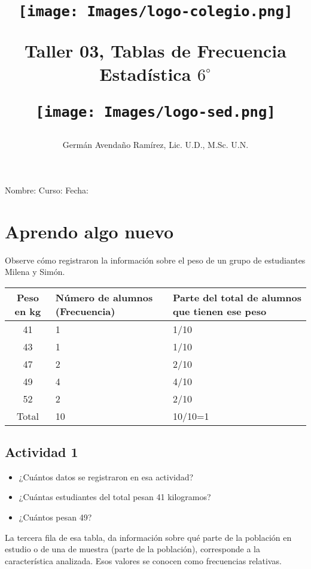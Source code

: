 \documentclass[10pt,twoside]{article}
\author{Germ\'an Avenda\~no Ram\'irez, Lic. U.D., M.Sc. U.N.}
\title{\begin{minipage}{.2\textwidth}
\texttt{[image: Images/logo-colegio.png]}\end{minipage}
\begin{minipage}{.55\textwidth}
\begin{center}
Taller 03, Tablas de Frecuencia  \\
Estadística $6^{\circ}$
\end{center}
\end{minipage}\hfill
\begin{minipage}{.2\textwidth}
\texttt{[image: Images/logo-sed.png]} 
\end{minipage}}
\date{}
\begin{document}
\maketitle
Nombre: \hrulefill Curso: \underline{\hspace*{44pt}} Fecha: \underline{\hspace*{2.5cm}}
\section*{Aprendo algo nuevo}
Observe cómo registraron la información sobre el peso de un grupo de estudiantes Milena y Simón.
\begin{center}
\begin{tabular}{|c|p{3.5cm}|p{6cm}|}
\hline 
Peso en kg & Número de alumnos (Frecuencia) & Parte del total de alumnos que tienen ese peso \\ 
\hline 
41 & 1 & 1/10 \\ 
\hline 
43 & 1 & 1/10 \\ 
\hline 
47 & 2 & 2/10 \\ 
\hline 
49 & 4 & 4/10 \\ 
\hline 
52 & 2 & 2/10 \\ 
\hline \hline
Total & 10 & 10/10=1 \\ \hline
\end{tabular} 
\end{center}
\subsection*{Actividad 1}
\begin{itemize}
\item ¿Cuántos datos se registraron en esa actividad?
\item ¿Cuántas estudiantes del total pesan 41 kilogramos?
\item ¿Cuántos pesan 49?
\end{itemize}
La tercera fila de esa tabla, da información sobre qué parte de la población en estudio o de una de muestra (parte de la población), corresponde a la característica analizada. Esos valores se conocen como frecuencias relativas.
\end{document}
